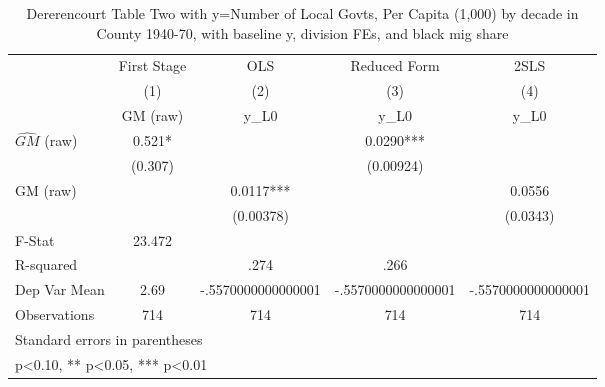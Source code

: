 \begin{table}[htbp]\centering
\def\sym#1{\ifmmode^{#1}\else\(^{#1}\)\fi}
\caption{Dererencourt Table Two with y=Number of Local Govts, Per Capita (1,000) by decade in County 1940-70, with baseline y, division FEs, and black mig share}
\begin{tabular}{l*{4}{c}}
\toprule
                    & First Stage   &         OLS   &Reduced Form   &        2SLS   \\
                    &\multicolumn{1}{c}{(1)}&\multicolumn{1}{c}{(2)}&\multicolumn{1}{c}{(3)}&\multicolumn{1}{c}{(4)}\\
                    &\multicolumn{1}{c}{GM  (raw)}&\multicolumn{1}{c}{y\_L0}&\multicolumn{1}{c}{y\_L0}&\multicolumn{1}{c}{y\_L0}\\
\midrule
$\hat{GM}$ (raw)    &       0.521*  &               &      0.0290***&               \\
                    &     (0.307)   &               &   (0.00924)   &               \\
\addlinespace
GM  (raw)           &               &      0.0117***&               &      0.0556   \\
                    &               &   (0.00378)   &               &    (0.0343)   \\
\midrule
F-Stat              &      23.472   &               &               &               \\
R-squared           &               &        .274   &        .266   &               \\
Dep Var Mean        &        2.69   &-.5570000000000001   &-.5570000000000001   &-.5570000000000001   \\
Observations        &         714   &         714   &         714   &         714   \\
\bottomrule
\multicolumn{5}{l}{\footnotesize Standard errors in parentheses}\\
\multicolumn{5}{l}{\footnotesize * p<0.10, ** p<0.05, *** p<0.01}\\
\end{tabular}
\end{table}
